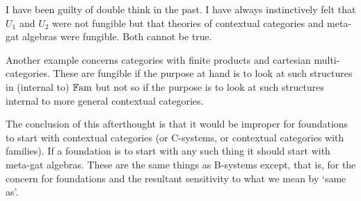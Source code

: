 \note I have been guilty of double think in the past. I have always instinctively felt that $U_1$ and
$U_2$ were not fungible but that theories of contextual categories and meta-gat algebras were fungible.
Both cannot be true.

\note Another example concerns categories with finite products and cartesian multi-categories. These are fungible if the purpose at hand is to look at such structures in (internal to) $\mathbb{F\mathrm{am}} $ but
not so if the purpose is to look at such structures internal to  more general contextual categories. 

\note The conclusion of this afterthought is that it would be improper for foundations to start with contextual categories
(or C-systems, or contextual categories with families). If a foundation is to start with any such thing it should start with 
meta-gat algebras. These are the same things as B-systems except, that is,  for the concern  for foundations and the resultant sensitivity to what we mean by `same as'.   


